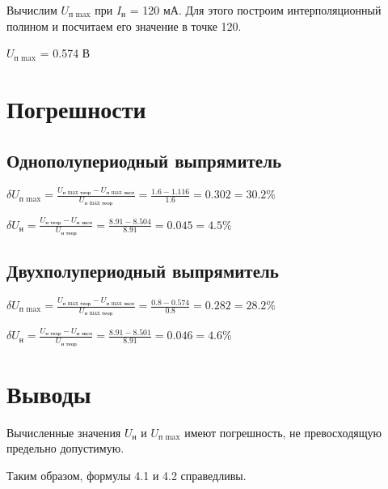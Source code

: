Вычислим $U_\text{п max}$ при $I_\text{н}$ = 120 мА. Для этого построим интерполяционный полином и посчитаем его значение в точке 120.

$U_\text{п max}$ = 0.574 В

\section{Погрешности}


\subsection{Однополупериодный выпрямитель}

$\delta U_\text{п max} = \frac{U_\text{п max\ \ теор} - U_\text{п max\ \ эксп}}{U_\text{п max\ \ теор}} = \frac{1.6 - 1.116}{1.6} = 0.302 = 30.2 \%$

$\delta U_\text{н} = \frac{U_\text{н\ \ теор} - U_\text{н\ \ эксп}}{U_\text{н\ \ теор}} = \frac{8.91 - 8.504}{8.91} = 0.045 = 4.5 \%$

\subsection{Двухполупериодный выпрямитель}

$\delta U_\text{п max} = \frac{U_\text{п max\ \ теор} - U_\text{п max\ \ эксп}}{U_\text{п max\ \ теор}} = \frac{0.8 - 0.574}{0.8} = 0.282 = 28.2 \%$

$\delta U_\text{н} = \frac{U_\text{н\ \ теор} - U_\text{н\ \ эксп}}{U_\text{н\ \ теор}} = \frac{8.91 - 8.501}{8.91} = 0.046 = 4.6 \%$

\section{Выводы}

Вычисленные значения $U_\text{н}$ и $U_\text{п max}$ имеют погрешность, не превосходящую предельно допустимую.

Таким образом, формулы 4.1 и 4.2 справедливы.


